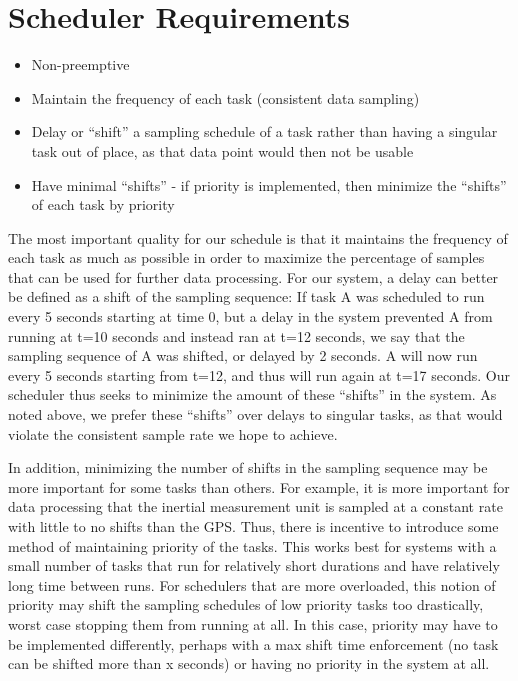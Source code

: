 \documentclass{article}
\begin{document}
\section{Scheduler Requirements}
\begin{itemize}
    \item Non-preemptive
    \item Maintain the frequency of each task (consistent data  sampling)
    \item Delay or ``shift'' a sampling schedule of a task rather than having a singular task out of place, as that data point would then not be usable
    \item Have minimal ``shifts'' - if priority is implemented, then minimize the ``shifts'' of each task by priority
\end{itemize}

The most important quality for our schedule is that it maintains the frequency of each task as much as possible in order to maximize the percentage of samples that can be used for further data processing. For our system, a delay can better be defined as a shift of the sampling sequence: If task A was scheduled to run every 5 seconds starting at time 0, but a delay in the system prevented A from running at t=10 seconds and instead ran at t=12 seconds, we say that the sampling sequence of A was shifted, or delayed by 2 seconds. A will now run every 5 seconds starting from t=12, and thus will run again at t=17 seconds. Our scheduler thus seeks to minimize the amount of these ``shifts'' in the system. As noted above, we prefer these ``shifts'' over delays to singular tasks, as that would violate the consistent sample rate we hope to achieve.


In addition, minimizing the number of shifts in the sampling sequence may be more important for some tasks than others. For example, it is more important for data processing that the inertial measurement unit is sampled at a constant rate with little to no shifts than the GPS. Thus, there is incentive to introduce some method of maintaining priority of the tasks. This works best for systems with a small number of tasks that run for relatively short durations and have relatively long time between runs. For schedulers that are more overloaded, this notion of priority may shift the sampling schedules of low priority tasks too drastically, worst case stopping them from running at all. In this case, priority may have to be implemented differently, perhaps with a max shift time enforcement (no task can be shifted more than x seconds) or having no priority in the system at all.
\end{document}
